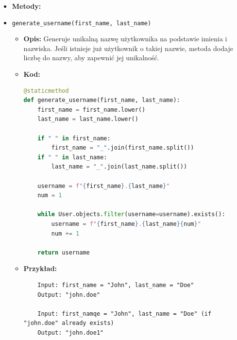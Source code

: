 \documentclass[12pt,a4paper,oneside]{article}
\theoremstyle{definition}
\numberwithin{equation}{section}
\begin{document}
\begin{itemize}
\begin{itemize}
        \item \texttt{clean\_phone\_number}
        \begin{itemize}
            \item \textbf{Opis:} Upewnia się, że numer telefonu zawiera dokładnie 9 cyfr.
            \item \textbf{Kod:}
            \begin{lstlisting}[language=Python, caption=Kod metody clean\_phone\_number]
def clean_phone_number(self):
    phone_number = self.cleaned_data.get("phone_number")
    parsed_phone_number = re.sub(r'\D', '', phone_number)
    if len(parsed_phone_number) != 9:
        raise ValidationError("Phone number must have exactly 9 digits.")
    return parsed_phone_number
        \end{lstlisting}
        \item \textbf{Przykład:}
        \begin{verbatim}
Input: phone_number = "+48 123-456-789"
Output: "123456789"
            \end{verbatim}
        \end{itemize}
    \end{itemize}
\clearpage %
    \item \textbf{Metody:}
    \item \texttt{generate\_username(first\_name, last\_name)}
    \begin{itemize}
        \item \textbf{Opis:} Generuje unikalną nazwę użytkownika na podstawie imienia i nazwiska. Jeśli istnieje już użytkownik o takiej nazwie, metoda dodaje liczbę do nazwy, aby zapewnić jej unikalność.
        \item \textbf{Kod:}
        \begin{lstlisting}[language=Python, caption=Kod metody generate\_username]
@staticmethod
def generate_username(first_name, last_name):
    first_name = first_name.lower()
    last_name = last_name.lower()

    if " " in first_name:
        first_name = "_".join(first_name.split())
    if " " in last_name:
        last_name = "_".join(last_name.split())

    username = f"{first_name}.{last_name}"
    num = 1

    while User.objects.filter(username=username).exists():
        username = f"{first_name}.{last_name}{num}"
        num += 1

    return username
        \end{lstlisting}
        \item \textbf{Przykład:}
        \begin{verbatim}
    Input: first_name = "John", last_name = "Doe"
    Output: "john.doe"

    Input: first_namqe = "John", last_name = "Doe" (if "john.doe" already exists)
    Output: "john.doe1"
        \end{verbatim}
    \end{itemize}
\end{itemize}
\end{document}
